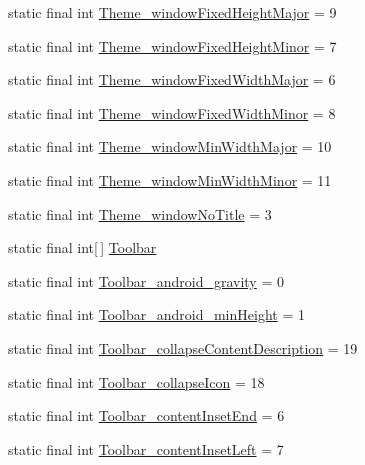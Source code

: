 \begin{DoxyCompactItemize}
\item 
static final int \hyperlink{classcheck_1_1test_1_1_r_1_1styleable_a9e8a42067e25b6c873f7293e9bee1343}{Theme\+\_\+window\+Fixed\+Height\+Major} = 9
\item 
static final int \hyperlink{classcheck_1_1test_1_1_r_1_1styleable_a8aa80c12e9d59fb6879aaf0273377731}{Theme\+\_\+window\+Fixed\+Height\+Minor} = 7
\item 
static final int \hyperlink{classcheck_1_1test_1_1_r_1_1styleable_aba8175a4427847a30a88e449000d7412}{Theme\+\_\+window\+Fixed\+Width\+Major} = 6
\item 
static final int \hyperlink{classcheck_1_1test_1_1_r_1_1styleable_ad9f0c51f93dc1efedfd42524c8d2acea}{Theme\+\_\+window\+Fixed\+Width\+Minor} = 8
\item 
static final int \hyperlink{classcheck_1_1test_1_1_r_1_1styleable_affa53ed5805b4fc7b71d664cddc7b88e}{Theme\+\_\+window\+Min\+Width\+Major} = 10
\item 
static final int \hyperlink{classcheck_1_1test_1_1_r_1_1styleable_aa7f575c9c5c290ba568031edf16a3bc6}{Theme\+\_\+window\+Min\+Width\+Minor} = 11
\item 
static final int \hyperlink{classcheck_1_1test_1_1_r_1_1styleable_a565578f526c7a9432c574c995bc827e2}{Theme\+\_\+window\+No\+Title} = 3
\item 
static final int\mbox{[}$\,$\mbox{]} \hyperlink{classcheck_1_1test_1_1_r_1_1styleable_a1a7fa90223693abef77e7484cca2df54}{Toolbar}
\item 
static final int \hyperlink{classcheck_1_1test_1_1_r_1_1styleable_a573eae0b826181d39d3b0ac3c26b7ec7}{Toolbar\+\_\+android\+\_\+gravity} = 0
\item 
static final int \hyperlink{classcheck_1_1test_1_1_r_1_1styleable_a50d77cb71359f8a286d3bcd9212afde6}{Toolbar\+\_\+android\+\_\+min\+Height} = 1
\item 
static final int \hyperlink{classcheck_1_1test_1_1_r_1_1styleable_abd8a8ed6f421b71bedf016b8648abba2}{Toolbar\+\_\+collapse\+Content\+Description} = 19
\item 
static final int \hyperlink{classcheck_1_1test_1_1_r_1_1styleable_a768d406fdf51c661de7d2c032a071146}{Toolbar\+\_\+collapse\+Icon} = 18
\item 
static final int \hyperlink{classcheck_1_1test_1_1_r_1_1styleable_a2dfa579a4e4d1b7daec868e5ef8667f9}{Toolbar\+\_\+content\+Inset\+End} = 6
\item 
static final int \hyperlink{classcheck_1_1test_1_1_r_1_1styleable_ab328787f8cee01addd35369b3193085f}{Toolbar\+\_\+content\+Inset\+Left} = 7

\end{DoxyCompactItemize}
